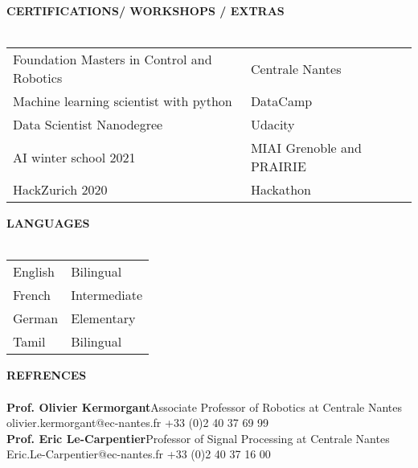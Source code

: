 \documentclass[11pt, a4paper]{article}
\newcommand{\lineunder} {
    \vspace*{-8pt} \\
    \hspace*{-18pt} \hrulefill \\
}
\newcommand{\header} [1] {
    {\hspace*{-18pt}\vspace*{6pt} \textsc{#1}}
    \vspace*{-6pt} \lineunder
}
\begin{document}
\vspace{5mm}
\header{\textbf{CERTIFICATIONS/ WORKSHOPS / EXTRAS}}
\vspace{1mm}
\renewcommand{\arraystretch}{1.5}
\begin{tabular}{ p{8cm}p{5cm} }
Foundation Masters in Control and Robotics   &Centrale Nantes  \\
Machine learning scientist with python    &DataCamp \\
Data Scientist Nanodegree &Udacity \\
AI winter school 2021 &MIAI Grenoble and PRAIRIE \\
HackZurich 2020 &Hackathon \\
\end{tabular}


 \newpage

\header{\textbf{LANGUAGES}}
\vspace{1mm}
\renewcommand{\arraystretch}{1.5}
\begin{tabular}{ p{3cm}p{3cm} }
English   &Bilingual  \\
French   &Intermediate \\
German &Elementary \\
Tamil &Bilingual \\
\end{tabular}



 \vspace{5mm}

\header{\textbf{REFRENCES}}
\vspace{3mm}
\textbf{Prof. Olivier Kermorgant}\hfill Associate Professor of Robotics at Centrale Nantes\\
olivier.kermorgant@ec-nantes.fr   \hfill +33 (0)2 40 37 69 99\\
\vspace{3mm}
\textbf{Prof. Eric Le-Carpentier}\hfill Professor of Signal Processing at Centrale Nantes\\
Eric.Le-Carpentier@ec-nantes.fr \hfill +33 (0)2 40 37 16 00\\
\end{document}
